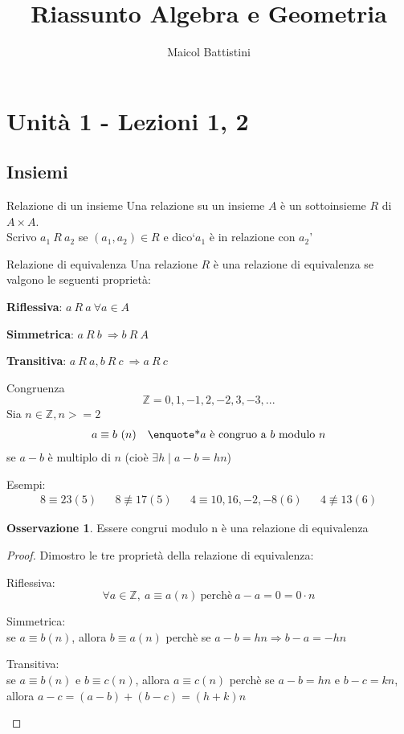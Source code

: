 \documentclass[a4paper]{article}
\title{Riassunto Algebra e Geometria}
\author{Maicol Battistini}
\theoremstyle{definition}
\newtheorem*{oss}{Osservazione}
\begin{document}
\maketitle
\tableofcontents
\newpage

\section{Unità 1 - Lezioni 1, 2}
\subsection{Insiemi}
\begin{deff}{Relazione di un insieme}{}
	Una relazione su un insieme \(A\) è un sottoinsieme \(R\) di \(A \times A\). \\
	Scrivo \(a_1 \ R \ a_2\) se \( (a_1, a_2) \in R\) e dico\enquote*{\(a_1\) è in relazione con \(a_2\)}
\end{deff}
\begin{deff}{Relazione di equivalenza}{}
	Una relazione \(R\) è una relazione di equivalenza se valgono le seguenti proprietà:
	\begin{description}
		\item \textbf{Riflessiva}: \(a \ R \ a \ \forall a \in A \)
		\item \textbf{Simmetrica}: \(a \ R \ b \ \Rightarrow b \ R \ A \)
		\item \textbf{Transitiva}: \(a \ R \ a, b \ R \ c \ \Rightarrow a \ R \ c \)
	\end{description}
\end{deff}
\begin{deff}{Congruenza}{}
	\[ \mathbb{Z} = {0, 1, -1, 2, -2, 3, -3, ...} \]
	Sia $n \in \mathbb{Z}, n >= 2$
	\begin{align*}
		a \equiv b \ (n) &  & \text{\enquote*{$a$ è congruo a $b$ modulo $n$}}
	\end{align*}
	se $a - b$ è multiplo di $n$ (cioè $\exists h \mid a - b = hn$)
\end{deff}
Esempi:
\begin{align*}
	8 \equiv 23 (5) &  & 8 \not\equiv 17(5) &  & 4 \equiv 10,16,-2,-8(6) &  & 4 \not\equiv 13(6)
\end{align*}
\begin{oss}
	Essere congrui modulo n è una relazione di equivalenza
\end{oss}
\begin{proof}
	Dimostro le tre proprietà della relazione di equivalenza:
	\begin{description}
		\item Riflessiva: \[ \forall a \in \mathbb{Z}, \ a \equiv a (n) \ \text{perchè} \ a - a = 0 = 0 \cdot n\]
		\item Simmetrica: \\ se $a \equiv b (n)$, allora $b \equiv a (n)$ perchè se $a - b = hn \Rightarrow b - a = -hn$
		\item Transitiva: \\ se $a \equiv b (n)$ e $b \equiv c (n)$, allora $a \equiv c (n)$ perchè se $a - b = hn$ e $b - c = kn$, allora $a - c = (a - b) + (b - c) = (h + k)n$
	\end{description}
\end{proof}
\end{document}
